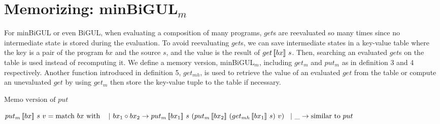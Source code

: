 \section{Memorizing: minBiGUL$_m$}

For minBiGUL or even BiGUL, when evaluating a composition of many programs, $get$s are reevaluated so many times since no intermediate state is stored during the evaluation. To avoid reevaluating $get$s, we can save intermediate states in a key-value table where the key is a pair of the program $bx$ and the source $s$, and the value is the result of $get \, [\![bx]\!] \ s$. Then, searching an evaluated $get$s on the table is used instead of recomputing it. We define a memory version, minBiGUL$_m$, including $get_m$ and $put_m$ as in definition 3 and 4 respectively. Another function introduced in definition 5, $get_{mh}$, is used to retrieve the value of an evaluated $get$ from the table or compute an unevaluated $get$ by using $get_m$ then store the key-value tuple to the table if necessary.

\begin{definition} $\text{Memo version of } put$

    $\putm{bx}{s}{v} = \text{match } bx \text{ with }\\
        \tab \vert \ bx_1 \circ bx_2 \to \putm{bx_1}{s}{(\putm{bx_2}{(\getmh{bx_1}{s})}{v})} \\
        \tab \vert \ \_ \to \text{similar to } put$
\end{definition}

